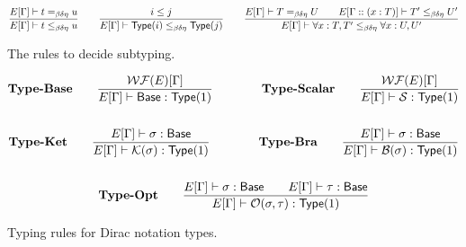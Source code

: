 \documentclass{article}
\begin{document}
\begin{figure}[h]
    \begin{gather*}
        \frac{E[\Gamma]\vdash t =_{\beta\delta\eta} u}{E[\Gamma]\vdash t \leq_{\beta\delta\eta} u} 
        \qquad
        \frac{i \leq j}{E[\Gamma] \vdash \mathsf{Type}(i) \leq_{\beta\delta\eta} \mathsf{Type}(j)}
        \qquad
        \frac{E[\Gamma] \vdash T =_{\beta\delta\eta} U \qquad E[\Gamma :: (x:T)]\vdash T' \leq_{\beta\delta\eta} U'}{E[\Gamma] \vdash \forall x : T, T' \leq_{\beta\delta\eta} \forall x : U, U'}
    \end{gather*}
    \caption{The rules to decide subtyping.}
\end{figure}

\begin{figure}[h]
    \begin{gather*}
        \textbf{Type-Base} \qquad
        \frac{\mathcal{WF}(E)[\Gamma]}{E[\Gamma]\vdash \mathsf{Base} : \mathsf{Type}(1)} 
        \qquad \qquad
        \textbf{Type-Scalar} \qquad
        \frac{\mathcal{WF}(E)[\Gamma]}{E[\Gamma]\vdash \mathcal{S} : \mathsf{Type}(1)} \\
        \\
        \textbf{Type-Ket} \qquad
        \frac{E[\Gamma]\vdash \sigma : \mathsf{Base}}{E[\Gamma]\vdash \mathcal{K}(\sigma) : \mathsf{Type}(1)}
        \qquad \qquad
        \textbf{Type-Bra} \qquad
        \frac{E[\Gamma]\vdash \sigma : \mathsf{Base}}{E[\Gamma]\vdash \mathcal{B}(\sigma) : \mathsf{Type}(1)} \\
        \\
        \textbf{Type-Opt} \qquad
        \frac{E[\Gamma]\vdash \sigma : \mathsf{Base} \qquad E[\Gamma]\vdash \tau : \mathsf{Base}}{E[\Gamma]\vdash \mathcal{O}(\sigma, \tau) : \mathsf{Type}(1)}
    \end{gather*}
    \caption{Typing rules for Dirac notation types.}
\end{figure}
\end{document}
